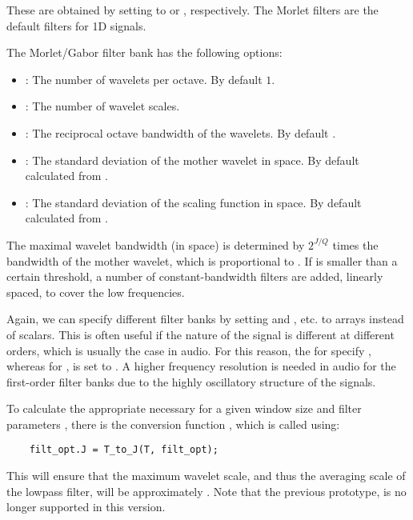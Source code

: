\documentclass[twocolumn]{article}
\begin{document}
These are obtained by setting  to  or , respectively. The Morlet filters are the default filters for 1D signals. 

The Morlet/Gabor filter bank has the following options:
\begin{itemize}
	\item {}: The number of wavelets per octave. By default $1$.
	\item {}: The number of wavelet scales.
	\item {}: The reciprocal octave bandwidth of the wavelets. By default .
	\item {}: The standard deviation of the mother wavelet in space. By default calculated from .
	\item {}: The standard deviation of the scaling function in space. By default calculated from .
\end{itemize}
The maximal wavelet bandwidth (in space) is determined by $2^{J/Q}$ times the bandwidth of the mother wavelet, which is proportional to . If  is smaller than a certain threshold, a number of constant-bandwidth filters are added, linearly spaced, to cover the low frequencies.

Again, we can specify different filter banks by setting  and , etc. to arrays instead of scalars. This is often useful if the nature of the signal is different at different orders, which is usually the case in audio. For this reason, the  for  specify , whereas for ,  is set to . A higher frequency resolution is needed in audio for the first-order filter banks due to the highly oscillatory structure of the signals.

To calculate the appropriate  necessary for a given window size  and filter parameters , there is the conversion function , which is called using:
\begin{lstlisting}
	filt_opt.J = T_to_J(T, filt_opt);
\end{lstlisting}
This will ensure that the maximum wavelet scale, and thus the averaging scale of the lowpass filter, will be approximately . Note that the previous prototype,  is no longer supported in this version.
\end{document}
